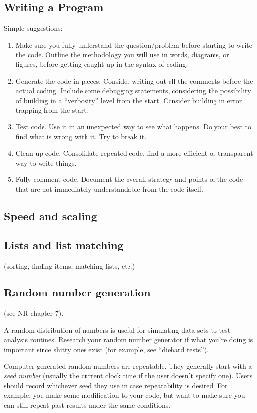 \documentclass{article}
\begin{document}
\subsection{Writing a Program}
Simple suggestions:
\begin{enumerate}
    \item Make sure you fully understand the question/problem before
        starting to write the code. Outline the methodology you will
        use in words, diagrams,
        or figures, before getting caught up in the syntax of coding.
    \item Generate the code in pieces. Consider writing out all the comments
        before the actual coding. Include some debugging statements, considering
        the possibility of building in a ``verbosity'' level from the start.
        Consider building in error trapping from the start.
    \item Test code. Use it in an unexpected way to see what happens. Do your
        best to find what is wrong with it. Try to break it.
    \item Clean up code. Consolidate repeated code, find a more efficient
        or transparent way to write things.
    \item Fully comment code. Document the overall strategy and points of the
        code that are not immediately understandable from the code itself.
\end{enumerate}

\subsection{Speed and scaling}
\subsection{Lists and list matching}
(sorting, finding items, matching lists, etc.)

\subsection{Random number generation}
(see NR chapter 7).

A random distribution of numbers is useful for simulating data sets to test
analysis routines. Research your random number generator if what you're doing
is important since shitty ones exist (for example, see ``diehard tests'').

Computer generated random numbers are repeatable. They generally start with
a \textit{seed number} (usually the current clock time if the user doesn't
specify one). Users should record whichever seed they use in case
repeatability is desired. For example, you make some modification to your
code, but want to make sure you can still repeat past results under the
same conditions.
\end{document}
